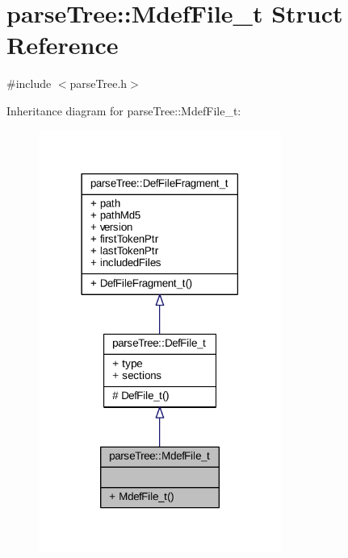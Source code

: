\hypertarget{structparse_tree_1_1_mdef_file__t}{}\section{parse\+Tree\+:\+:Mdef\+File\+\_\+t Struct Reference}
\label{structparse_tree_1_1_mdef_file__t}


{\ttfamily \#include $<$parse\+Tree.\+h$>$}



Inheritance diagram for parse\+Tree\+:\+:Mdef\+File\+\_\+t\+:
\nopagebreak
\begin{figure}[H]
\begin{center}
\leavevmode
\includegraphics[width=225pt]{structparse_tree_1_1_mdef_file__t__inherit__graph}
\end{center}
\end{figure}


